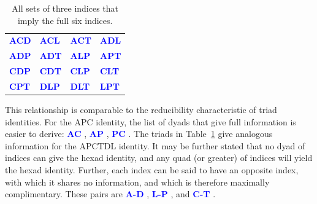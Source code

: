\documentclass[11pt,oneside]{article} %
\newcommand\eg[1]{%
 \textcolor{blue}{\textbf{#1}\hspace{-.3em}}
}
\begin{document}
\begin{table}[h]
\centering
\caption{All sets of three indices that imply the full six indices.}
\label{tab:set3}
\begin{tabular}{llll}
\hline
\eg{ACD} & \eg{ACL} & \eg{ACT} & \eg{ADL}\\
\eg{ADP} & \eg{ADT} & \eg{ALP} & \eg{APT}\\
\eg{CDP} & \eg{CDT} & \eg{CLP} & \eg{CLT}\\
\eg{CPT} & \eg{DLP} & \eg{DLT} & \eg{LPT}
\end{tabular}
\end{table}

This relationship is comparable to the reducibility characteristic of triad
identities. For the APC identity, the list of dyads that give full
information is easier to derive: \eg{AC}, \eg{AP}, \eg{PC}. The triads in
Table~\ref{tab:set3} give analogous information for the APCTDL identity.
It may be further stated that no dyad of indices can give the hexad identity,
and any quad (or greater) of indices will yield the hexad identity. Further,
each index can be said to have an opposite index, with which it shares no
information, and which is therefore maximally complimentary. These pairs are
\eg{A-D}, \eg{L-P}, and \eg{C-T}.
\end{document}
